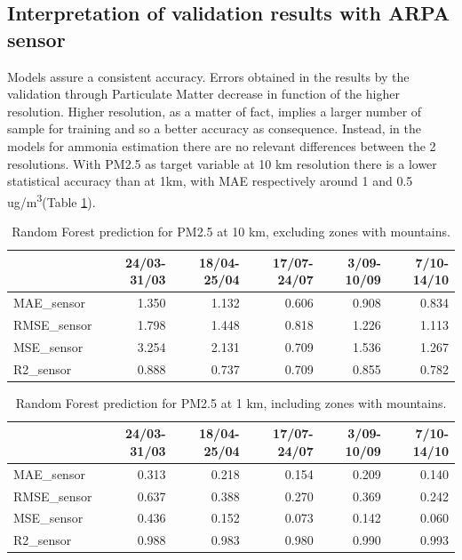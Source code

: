\subsection{Interpretation of validation results with ARPA sensor}
Models assure a consistent accuracy.
Errors obtained in the results by the validation through Particulate Matter decrease in function of the higher resolution.
Higher resolution, as a matter of fact, implies a larger number of sample for training and so a better accuracy as consequence.
Instead, in the models for ammonia estimation there are no relevant differences between the 2 resolutions.
With PM2.5 as target variable at 10 km resolution there is a lower statistical accuracy than at 1km, with MAE respectively around 1 and 0.5 ug/m\textsuperscript{3}(Table \ref{tab:res1km}). 
\begin{table}[H]
\begin{tabular}{lrrrrr}
\toprule
  &  24/03-31/03 &  18/04-25/04 &  17/07-24/07 &  3/09-10/09 &  7/10-14/10 \\
\midrule
 MAE\_sensor &        1.350 &        1.132 &        0.606 &       0.908 &       0.834 \\
RMSE\_sensor &        1.798 &        1.448 &        0.818 &       1.226 &       1.113 \\
 MSE\_sensor &        3.254 &        2.131 &        0.709 &       1.536 &       1.267 \\
  R2\_sensor &        0.888 &        0.737 &        0.709 &       0.855 &       0.782 \\
\bottomrule
\end{tabular}
\caption{Random Forest prediction for PM2.5 at 10 km, excluding zones with mountains.}
\end{table}
\begin{table}[H]
\begin{tabular}{lrrrrr}
\toprule
  &  24/03-31/03 &  18/04-25/04 &  17/07-24/07 &  3/09-10/09 &  7/10-14/10 \\
\midrule
 MAE\_sensor &        0.313 &        0.218 &        0.154 &       0.209 &       0.140 \\
RMSE\_sensor &        0.637 &        0.388 &        0.270 &       0.369 &       0.242 \\
 MSE\_sensor &        0.436 &        0.152 &        0.073 &       0.142 &       0.060 \\
  R2\_sensor &        0.988 &        0.983 &        0.980 &       0.990 &       0.993 \\
\bottomrule
\end{tabular}
\caption{Random Forest prediction for PM2.5 at 1 km, including zones with mountains.}
\label{tab:res1km}
\end{table}

